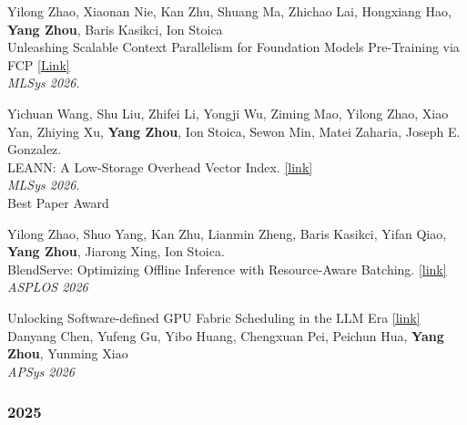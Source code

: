 \documentclass[letterpaper, 11pt]{article}
\newcounter{mySaveCounter}
\newenvironment{myEnumerateCitation}{%
  \begin{enumerate}[label={[\arabic*]},ref={[\arabic*]}]
    \usecounter{enumi}%
    \setcounter{enumi}{\value{mySaveCounter}}
    \setlength{\itemsep}{0pt}%
    \setlength{\parskip}{5pt}%
}
{%
  \setcounter{mySaveCounter}{\value{enumi}}\end{enumerate}%
}
\begin{document}
\begin{myEnumerateCitation}
\item Yilong Zhao, Xiaonan Nie, Kan Zhu, Shuang Ma, Zhichao Lai, Hongxiang Hao, \textbf{Yang Zhou}, Baris Kasikci, Ion Stoica
\\Unleashing Scalable Context Parallelism for Foundation Models Pre-Training via FCP \href{https://proceedings.mlsys.org/paper_files/paper/2026/file/e01c431bbb83153632c0dcfaf8ccda0a-Paper-Conference.pdf}{[Link]}
\\\textit{MLSys 2026}.

\item Yichuan Wang, Shu Liu, Zhifei Li, Yongji Wu, Ziming Mao, Yilong Zhao, Xiao Yan, Zhiying Xu, \textbf{Yang Zhou}, Ion Stoica, Sewon Min, Matei Zaharia, Joseph E. Gonzalez.
\\LEANN: A Low-Storage Overhead Vector Index. \href{https://proceedings.mlsys.org/paper_files/paper/2026/file/e27ea0cd50b798ff8942caf9203f0992-Paper-Conference.pdf}{[link]}
\\\textit{MLSys 2026}. 
\\{\color{red} Best Paper Award}

\item Yilong Zhao\*, Shuo Yang\*, Kan Zhu, Lianmin Zheng, Baris Kasikci, Yifan Qiao, \textbf{Yang Zhou}, Jiarong Xing, Ion Stoica.
\\BlendServe: Optimizing Offline Inference with Resource-Aware Batching. \href{https://dl.acm.org/doi/epdf/10.1145/3779212.3790133}{[link]}
\\\textit{ASPLOS 2026}

\item Unlocking Software-defined GPU Fabric Scheduling in the LLM Era \href{https://dl.acm.org/doi/epdf/10.1145/3838177.3841731}{[link]}
\\Danyang Chen, Yufeng Gu, Yibo Huang, Chengxuan Pei, Peichun Hua, \textbf{Yang Zhou}, Yunming Xiao
\\\textit{APSys 2026}

\end{myEnumerateCitation}

\vspace{-0.5cm}
\subsubsection*{2025}
\vspace{-0.1cm}
\end{document}
